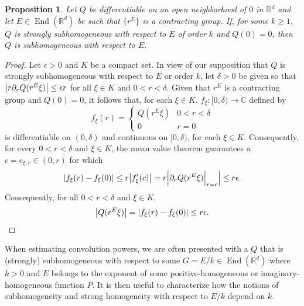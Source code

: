 \documentclass[11pt, letter]{book}
\newtheorem{proposition}[theorem]{Proposition}
\newcommand\End{\operatorname{End}} %
\begin{document}
\begin{framed}
\begin{proposition}\label{prop:supersub_implies_sub}
Let $Q$ be differentiable on an open neighborhood of $0$ in $\mathbb{R}^d$ and let $E\in\End(\mathbb{R}^d)$ be such that $\{r^E\}$ is a contracting group. If, for some $k\geq 1$, $Q$ is strongly subhomogeneous with respect to $E$ of order $k$ and $Q(0)=0$, then $Q$ is subhomogeneous with respect to $E$.
\end{proposition}
\end{framed}
\begin{proof}
Let $\epsilon>0$ and $K$ be a compact set.  In view of our supposition that $Q$ is strongly subhomogeneous with respect to $E$ or order $k$, let $\delta>0$ be given so that $\abs{r\partial_r Q(r^E\xi)}\leq \epsilon r$ for all $\xi\in K$ and $0<r< \delta$. Given that $r^E$ is a contracting group and $Q(0)=0$, it follows that, for each $\xi\in K$, $f_{\xi}:[0,\delta)\to\mathbb{C}$ defined by
\begin{equation*}
f_{\xi}(r)=\begin{cases}
Q(r^E\xi) & 0<r<\delta\\
0 & r=0
\end{cases}
\end{equation*}
is differentiable on $(0,\delta)$ and continuous on $[0,\delta)$, for each $\xi\in K$. Consequently, for every $0<r<\delta$ and $\xi\in K$, the mean value theorem guarantees a $c=c_{\xi,r}\in (0,r)$ for which 
\begin{equation*}
\abs{f_{\xi}(r)-f_{\xi}(0)}\leq r\abs{f_{\xi}'(c)}=r\abs{\partial_r Q(r^E\xi)\Big\vert_{r=c}}\leq r\epsilon.
\end{equation*}
Consequently, for all $0<r<\delta$ and $\xi\in K$,
\begin{equation*}
\abs{Q(r^E\xi)}=\abs{f_{\xi}(r)-f_{\xi}(0)}\leq r\epsilon.
\end{equation*}
\end{proof}


\noindent  When estimating convolution powers, we are often presented with a $Q$ that is (strongly) subhomogeneous with respect to some $G = E/k \in \End{(\mathbb{R}^d)}$ where $k>0$ and $E$ belongs to the exponent of some positive-homogeneous or imaginary-homogeneous function $P$. It is then useful to characterize how the notions of subhomogeneity and strong homogeneity with respect to $E/k$ depend on $k$.
\end{document}
